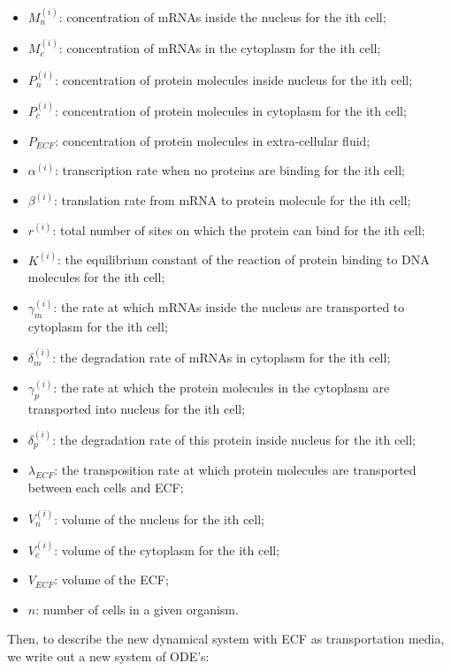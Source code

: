 \documentclass[12pt]{article}
\renewcommand{\(}{\left (}
\renewcommand{\)}{\right )}
\begin{document}
\begin{itemize}
    \item $M_n^{(i)}$: concentration of mRNAs inside the nucleus for the ith cell;
    \item $M_c^{(i)}$: concentration of mRNAs in the cytoplasm for the ith cell;
    \item $P_n^{(i)}$: concentration of protein molecules inside nucleus for the ith cell;
    \item $P_c^{(i)}$: concentration of protein molecules in cytoplasm for the ith cell;
    \item $P_{ECF}$: concentration of protein molecules in extra-cellular fluid;
    \item $\alpha^{(i)}$: transcription rate when no proteins are binding for the ith cell;
    \item $\beta^{(i)}$: translation rate from mRNA to protein molecule for the ith cell;
    \item $r^{(i)}$: total number of sites on which the protein can bind for the ith cell;
    \item $K^{(i)}$: the equilibrium constant of the reaction of protein binding to DNA molecules for the ith cell;
    \item $\gamma_m^{(i)}$: the rate at which mRNAs inside the nucleus are transported to cytoplasm for the ith cell;
    \item $\delta_m^{(i)}$: the degradation rate of mRNAs in cytoplasm for the ith cell;
    \item $\gamma_p^{(i)}$: the rate at which the protein molecules in the cytoplasm are transported into nucleus for the ith cell;
    \item $\delta_p^{(i)}$: the degradation rate of this protein inside nucleus for the ith cell;
    \item $\lambda_{ECF}$: the transposition rate at which protein molecules are transported between each cells and ECF;
    \item $V_n^{(i)}$: volume of the nucleus for the ith cell;
    \item $V_c^{(i)}$: volume of the cytoplasm for the ith cell;
    \item $V_{ECF}$: volume of the ECF;
    \item $n$: number of cells in a given organism.

\end{itemize}

Then, to describe the new dynamical system with ECF as transportation media, we write out a new system of ODE's:\\
\end{document}
